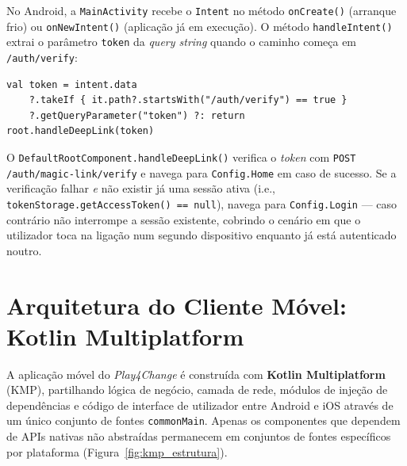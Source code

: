 No Android, a \texttt{MainActivity} recebe o \texttt{Intent} no método
\texttt{onCreate()} (arranque frio) ou \texttt{onNewIntent()} (aplicação
já em execução).
O método \texttt{handleIntent()} extrai o parâmetro \texttt{token} da
\textit{query string} quando o caminho começa em \texttt{/auth/verify}:

\begin{verbatim}
val token = intent.data
    ?.takeIf { it.path?.startsWith("/auth/verify") == true }
    ?.getQueryParameter("token") ?: return
root.handleDeepLink(token)
\end{verbatim}

O \texttt{DefaultRootComponent.handleDeepLink()} verifica o \textit{token}
com \texttt{POST /auth/magic-link/verify} e navega para
\texttt{Config.Home} em caso de sucesso.
Se a verificação falhar \emph{e} não existir já uma sessão ativa
(i.e., \texttt{tokenStorage.getAccessToken() == null}), navega para
\texttt{Config.Login} — caso contrário não interrompe a sessão existente,
cobrindo o cenário em que o utilizador toca na ligação num segundo
dispositivo enquanto já está autenticado noutro.

\section{Arquitetura do Cliente Móvel: Kotlin Multiplatform}
\label{sec:kmp_arquitetura}

A aplicação móvel do \textit{Play4Change} é construída com
\textbf{Kotlin Multiplatform} (KMP), partilhando lógica de negócio,
camada de rede, módulos de injeção de dependências e código de interface
de utilizador entre Android e iOS através de um único conjunto de fontes
\texttt{commonMain}.
Apenas os componentes que dependem de APIs nativas não abstraídas
permanecem em conjuntos de fontes específicos por plataforma
(Figura~\ref{fig:kmp_estrutura}).

